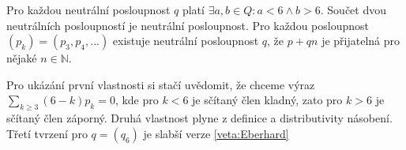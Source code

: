 \begin{tvrz}\label{veta:posloupnosti}
Pro každou neutrální posloupnost $q$ platí $\exists a,b \in Q : a <6 \wedge b>6$.
Součet dvou neutrálních posloupností je neutrální posloupnost.
Pro každou posloupnost $(p_k) = (p_3,p_4,...)$ existuje neutrální posloupnost $q$, že $p+qn$ je přijatelná pro nějaké $n \in \mathbb{N}$.
\end{tvrz}

Pro ukázání první vlastnosti si stačí uvědomit, že chceme výraz $\sum_{k \geq 3}{(6-k)p_k} = 0$, kde pro $k < 6$ je sčítaný člen kladný, zato pro $k>6$ je sčítaný člen záporný. Druhá vlastnost plyne z definice a distributivity násobení. Třetí tvrzení pro $q = (q_6)$ je slabší verze \eqref{veta:Eberhard}



